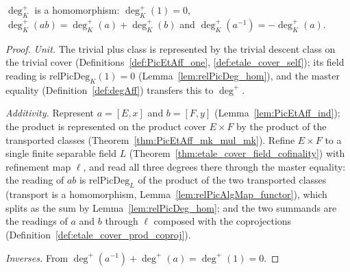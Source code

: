 \begin{theorem}
  \label{thm:degAff_hom}
  \leanok
  \(\deg^{+}_K\) is a homomorphism: \(\deg^{+}_K(1) = 0\),
  \(\deg^{+}_K(a b) = \deg^{+}_K(a) + \deg^{+}_K(b)\) and
  \(\deg^{+}_K(a^{-1}) = -\deg^{+}_K(a)\).
\end{theorem}
\begin{proof}
  \leanok
  \emph{Unit.} The trivial plus class is represented by the trivial descent class on the
  trivial cover (Definitions~\ref{def:PicEtAff_one}, \ref{def:etale_cover_self}); its field
  reading is \(\mathrm{relPicDeg}_K(1) = 0\) (Lemma~\ref{lem:relPicDeg_hom}), and the master
  equality (Definition~\ref{def:degAff}) transfers this to \(\deg^{+}\).

  \emph{Additivity.} Represent \(a = [E,x]\) and \(b = [F,y]\)
  (Lemma~\ref{lem:PicEtAff_ind}); the product is represented on the product cover
  \(E \times F\) by the product of the transported classes
  (Theorem~\ref{thm:PicEtAff_mk_mul_mk}). Refine \(E \times F\) to a single finite separable
  field \(L\) (Theorem~\ref{thm:etale_cover_field_cofinality}) with refinement map \(\ell\),
  and read all three degrees there through the master equality: the reading of \(ab\) is
  \(\mathrm{relPicDeg}_L\) of the product of the two transported classes (transport is a
  homomorphism, Lemma~\ref{lem:relPicAlgMap_functor}), which splits as the sum by
  Lemma~\ref{lem:relPicDeg_hom}; and the two summands are the readings of \(a\) and \(b\)
  through \(\ell\) composed with the coprojections
  (Definition~\ref{def:etale_cover_prod_coproj}).

  \emph{Inverses.} From \(\deg^{+}(a^{-1}) + \deg^{+}(a) = \deg^{+}(1) = 0\).
\end{proof}

